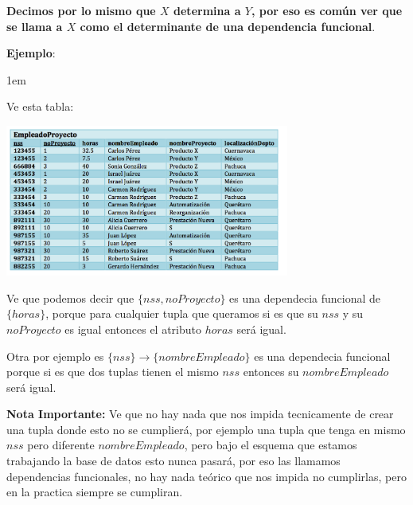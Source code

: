 \documentclass[12pt, fleqn]{report}                             %
\newenvironment{SmallIndentation}[1][0.75em]                    %
        {\begin{adjustwidth}{#1}{}\begin{footnotesize}}             %
        {\end{footnotesize}\end{adjustwidth}}                       %
\theoremstyle{break}                                            %
\begin{document}
                \textbf{Decimos por lo mismo que $X$ determina a $Y$, por eso es común ver que se llama
                a $X$ como el determinante de una dependencia funcional}.

                \vspace{2em}
                \textbf{Ejemplo}:
                \begin{SmallIndentation}[1em]

                    Ve esta tabla:

                    \includegraphics[width=0.70\textwidth]{EjemploTablaSinNormalizar}

                    Ve que podemos decir que $\{nss, noProyecto\}$ es una dependecia funcional
                    de $\{horas\}$, porque para cualquier tupla que queramos si es que su $nss$ y su
                    $noProyecto$ es igual entonces el atributo $horas$ será igual.

                    Otra por ejemplo es $\{nss\} \to \{nombreEmpleado\}$ es una dependecia funcional
                    porque si es que dos tuplas tienen el mismo $nss$ entonces su $nombreEmpleado$
                    será igual.

                    \textbf{Nota Importante:} Ve que no hay nada que nos impida tecnicamente de crear
                    una tupla donde esto no se cumplierá, por ejemplo una tupla que tenga en mismo
                    $nss$ pero diferente $nombreEmpleado$, pero bajo el esquema que estamos trabajando
                    la base de datos esto nunca pasará, por eso las llamamos dependencias funcionales,
                    no hay nada teórico que nos impida no cumplirlas, pero en la practica siempre
                    se cumpliran.

                \end{SmallIndentation}
                    
\end{document}
